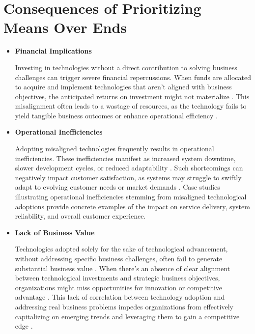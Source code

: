 \documentclass[a4Paper]{article}
\begin{document}
\section{Consequences of Prioritizing Means Over Ends}
\begin{itemize}
    \item \textbf{Financial Implications}
    
    Investing in technologies without a direct contribution to solving business challenges can trigger severe financial repercussions. When funds are allocated to acquire and implement technologies that aren't aligned with business objectives, the anticipated returns on investment might not materialize \cite{ilmudeen2019does, al2020impact}. This misalignment often leads to a wastage of resources, as the technology fails to yield tangible business outcomes or enhance operational efficiency \cite{al2020impact}.
    \item \textbf{Operational Inefficiencies}
    
    Adopting misaligned technologies frequently results in operational inefficiencies. These inefficiencies manifest as increased system downtime, slower development cycles, or reduced adaptability \cite{rahimi2016business}. Such shortcomings can negatively impact customer satisfaction, as systems may struggle to swiftly adapt to evolving customer needs or market demands \cite{abrahamsson2017agile}. Case studies illustrating operational inefficiencies stemming from misaligned technological adoptions provide concrete examples of the impact on service delivery, system reliability, and overall customer experience.
    \item \textbf{Lack of Business Value}

    Technologies adopted solely for the sake of technological advancement, without addressing specific business challenges, often fail to generate substantial business value \cite{ilmudeen2019does}. When there's an absence of clear alignment between technological investments and strategic business objectives, organizations might miss opportunities for innovation or competitive advantage \cite{anzoategui2019endogenous}. This lack of correlation between technology adoption and addressing real business problems impedes organizations from effectively capitalizing on emerging trends and leveraging them to gain a competitive edge \cite{al2020impact}.

\end{itemize}

\pagebreak
\end{document}
